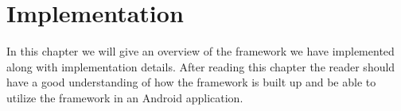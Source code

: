 \chapter{Implementation}
In this chapter we will give an overview of the framework we have implemented along with implementation details. After reading this chapter the reader should have a good understanding of how the framework is built up and be able to utilize the framework in an Android application.



